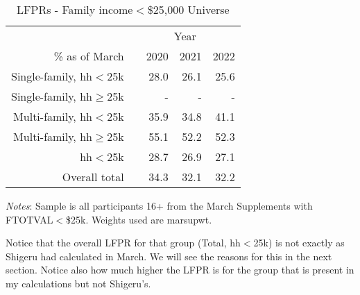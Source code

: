 \documentclass{article}
\newcommand{\mct}[1]{\multicolumn{1}{c}{#1}}
\newcommand{\mc}[3]{\multicolumn{#1}{#2}{#3}}
\begin{document}
	
		\begin{table}[H]
		\centering
		\caption{LFPRs - Family income$<$\$25,000 Universe}
		\begin{tabularx}{0.8\textwidth}{@{\extracolsep{\fill}}r r r r r }
			\toprule 
			& \mc{4}{c}{Year}  \\ \cmidrule(lr){2-5}
			\% as of March 	& 		&	\mct{2020}	&	\mct{2021}	&	\mct{2022}	\\ \midrule
			Single-family, hh$<$25k \hspace{0.1cm} 		&	&	28.0	&	26.1	&	25.6	\\	
			Single-family, hh$\ge$25k \hspace{0.1cm} 		&	&	-	&	-	&	-	\\	
			
			Multi-family, hh$<$25k \hspace{0.1cm}  	&	&	35.9	&	34.8	&	41.1	\\
			Multi-family, hh$\ge$25k \hspace{0.1cm}  	&	&	55.1	&	52.2	&	52.3	\\
			\midrule
			hh$<$25k \hspace{0.1cm}  	&	&	28.7	& 	26.9	&	27.1		\\
			Overall total \hspace{0.1cm}  	&	&	34.3	&	32.1	&	32.2	\\
			\bottomrule
		\end{tabularx}
		\vspace{1mm}
		\vspace{1mm}
		\begin{minipage}[t]{\textwidth}
			\footnotesize{\emph{Notes}: Sample is all participants 16+ from the March Supplements with FTOTVAL$<$\$25k. Weights used are marsupwt.}
		\end{minipage}
	\end{table}
	
	
	Notice that the overall LFPR for that group (Total, hh$<$25k) is not exactly as Shigeru had calculated in March. We will see the reasons for this in the next section. Notice also how much higher the LFPR is for the group that is present in my calculations but not Shigeru's.
	
\end{document}
